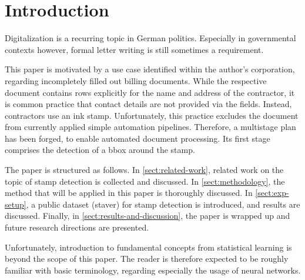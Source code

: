 \section{Introduction}
Digitalization is a recurring topic in German politics. Especially in governmental
contexts however, formal letter writing is still sometimes a requirement.

This paper is motivated by a use case identified within the author's corporation,
regarding incompletely filled out billing documents. While the respective document
contains rows explicitly for the name and address of the contractor, it is common
practice that contact details are not provided via the fields. Instead, contractors
use an ink stamp. Unfortunately, this practice excludes the document from currently
applied simple automation pipelines. Therefore, a multistage plan has been
forged, to enable automated document processing. Its first stage comprises the
detection of a \gls{bbox} around the stamp.

The paper is structured as follows. In \cref{sect:related-work}, related work
on the topic of stamp detection is collected and discussed. In \cref{sect:methodology},
the method that will be applied in this paper is thoroughly discussed. In \cref{sect:exp-setup},
a public dataset (\acrshort{staver}) for stamp detection is introduced, and results
are discussed. Finally, in \cref{sect:results-and-discussion}, the paper is wrapped
up and future research directions are presented.

Unfortunately, introduction to fundamental concepts from statistical learning is
beyond the scope of this paper. The reader is therefore expected to be roughly
familiar with basic terminology, regarding especially the usage of neural networks.
